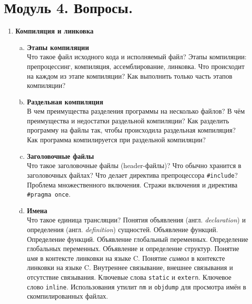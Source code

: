\documentclass{article}
\begin{document}

\section*{Модуль 4. Вопросы.}
\begin{enumerate}

\item \textbf{Компиляция и линковка}
\begin{enumerate}[a.]

\item \textbf{Этапы компиляции}\\
Что такое файл исходного кода и исполняемый файл? Этапы компиляции: препроцессинг, компиляция, ассемблирование, линковка. Что происходит на каждом из этапе компиляции? Как выполнить только часть этапов компиляции?

\item \textbf{Раздельная компиляция}\\
В чем преимущества разделения программы на несколько файлов? В чём преимущества и недостатки раздельной компиляции? Как разделить программу на файлы так, чтобы происходила раздельная компиляция? Как программа компилируется при раздельной компиляции?
 
\item \textbf{Заголовочные файлы}\\
Что такое заголовочные файлы (header-файлы)? Что обычно хранится в заголовочных файлах? Что делает директива препроцессора \texttt{\#include}? Проблема множественного включения. Стражи включения и директива \texttt{\#pragma once}.

\item \textbf{Имена}\\
Что такое единица трансляции?  Понятия объявления (англ. \textit{declaration}) и определения (англ. \textit{definition}) сущностей. Объявление функций. Определение функций. Объявление глобальный переменных. Определение глобальных переменных. Объявление и определение структур. Понятие \textit{имя} в контексте линковки на языке C. Понятие \textit{символ} в контексте линковки на языке C. Внутреннее связывание, внешнее связывания и отсутствие связывания. Ключевые слова \texttt{static} и \texttt{extern}. Ключевое слово \texttt{inline}. Использования утилит \texttt{nm} и \texttt{objdump} для просмотра имён в скомпилированных файлах.


\end{enumerate}
\end{enumerate}
\end{document}
